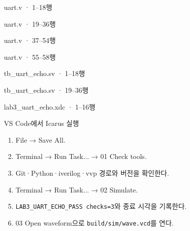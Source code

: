 \begin{frame}[fragile]{uart.v · 1–18행}

\end{frame}

\begin{frame}[fragile]{uart.v · 19–36행}

\end{frame}

\begin{frame}[fragile]{uart.v · 37–54행}

\end{frame}

\begin{frame}[fragile]{uart.v · 55–58행}

\end{frame}

\begin{frame}[fragile]{tb\_uart\_echo.sv · 1–18행}

\end{frame}

\begin{frame}[fragile]{tb\_uart\_echo.sv · 19–36행}

\end{frame}

\begin{frame}[fragile]{lab3\_uart\_echo.xdc · 1–16행}

\end{frame}


\begin{frame}[label=simulate]{VS Code에서 Icarus 실행}
\small
\begin{enumerate}
\item File → Save All.
\item Terminal → Run Task... → 01 Check tools.
\item Git·Python·iverilog·vvp 경로와 버전을 확인한다.
\item Terminal → Run Task... → 02 Simulate.
\item \texttt{LAB3\_UART\_ECHO\_PASS checks=3}와 종료 시각을 기록한다.
\item 03 Open waveform으로 \texttt{build/sim/wave.vcd}를 연다.
\end{enumerate}
\end{frame}

